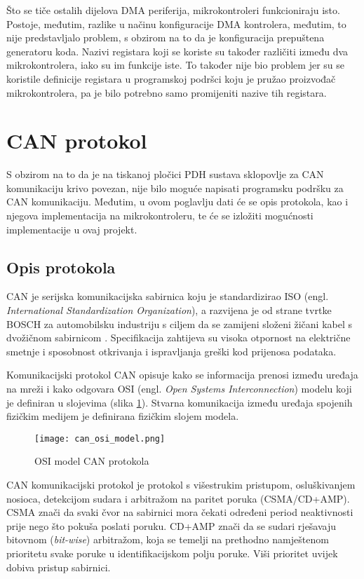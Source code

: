 Što se tiče ostalih dijelova DMA periferija, mikrokontroleri funkcioniraju isto. Postoje, međutim, razlike u načinu konfiguracije DMA kontrolera, međutim, to nije predstavljalo problem, s obzirom na to da je konfiguracija prepuštena generatoru koda. Nazivi registara koji se koriste su također različiti između dva mikrokontrolera, iako su im funkcije iste. To također nije bio problem jer su se koristile definicije registara u programskoj podršci koju je pružao proizvođač mikrokontrolera, pa je bilo potrebno samo promijeniti nazive tih registara.

\section{CAN protokol}

S obzirom na to da je na tiskanoj pločici PDH sustava sklopovlje za CAN komunikaciju krivo povezan, nije bilo moguće napisati programsku podršku za CAN komunikaciju. Međutim, u ovom poglavlju dati će se opis protokola, kao i njegova implementacija na mikrokontroleru, te će se izložiti mogućnosti implementacije u ovaj projekt.

\subsection{Opis protokola}

CAN je serijska komunikacijska sabirnica koju je standardizirao ISO (engl. \textit{International Standardization Organization}), a razvijena je od strane tvrtke BOSCH za automobilsku industriju s ciljem da se zamijeni složeni žičani kabel s dvožičnom sabirnicom \cite{can_manual}. Specifikacija zahtijeva su visoka otpornost na električne smetnje i sposobnost otkrivanja i ispravljanja greški kod prijenosa podataka.

Komunikacijski protokol CAN opisuje kako se informacija prenosi između uređaja na mreži i kako odgovara OSI (engl. \textit{Open Systems Interconnection}) modelu koji je definiran u slojevima (slika \ref{fig:can_osi_model}). Stvarna komunikacija između uređaja spojenih fizičkim medijem je definirana fizičkim slojem modela.

\begin{figure}[H]
	\centering
	\texttt{[image: can\_osi\_model.png]}
	\caption{OSI model CAN protokola \cite[str. 2]{can_manual}}
	\label{fig:can_osi_model}
\end{figure}

CAN komunikacijski protokol je protokol s višestrukim pristupom, osluškivanjem nosioca, detekcijom sudara i arbitražom na paritet poruka (CSMA/CD+AMP). CSMA znači da svaki čvor na sabirnici mora čekati određeni period neaktivnosti prije nego što pokuša poslati poruku. CD+AMP znači da se sudari rješavaju bitovnom (\textit{bit-wise}) arbitražom, koja se temelji na prethodno namještenom prioritetu svake poruke u identifikacijskom polju poruke. Viši prioritet uvijek dobiva pristup sabirnici.

